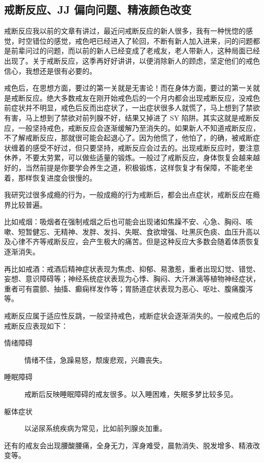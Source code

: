 \documentclass[fontset=founder]{ctexart}
\begin{document}
\subsection{戒断反应、JJ 偏向问题、精液颜色改变}

戒断反应我以前的文章有讲过，最近问戒断反应的新人很多，我有一种恍惚的感觉，时空错位的感觉，戒色吧已经进入了轮回，不断有新人加入进来，问的问题都是前辈问过的问题，而以前的新人已经变成了老戒友，老人带新人，这种局面已经出现了。关于戒断反应，这季再好好讲讲，以便消除新人的顾虑，坚定他们的戒色信心，我想还是很有必要的。

戒色后，在思想方面，要过的第一关就是无害论！而在身体方面，要过的第一关就是戒断反应。绝大多数戒友在刚开始戒色后的一个月内都会出现戒断反应，没戒色前症状并不明显，戒色后反而出症状了，一出症状很多人就慌了，马上想到了禁欲有害，马上想到了禁欲对前列腺不好，结果又掉进了 SY 陷阱。其实这就是戒断反应，一般坚持戒色，戒断反应会逐渐缓解乃至消失的。如果新人不知道戒断反应，不了解戒断反应，那就很可能会起退心了。因为他慌了，他怕了，的确，被戒断症状缠着的感受不好过，但只要坚持，戒断反应会过去的。出现戒断反应时，要注意休养，不要太劳累，可以做些适量的锻炼。一般过了戒断反应，身体恢复会越来越好的，当然前提是你要学会养生之道，积极锻炼，这样恢复才有保障，不能老坐着，那样恢复进度会很慢的。

我研究过很多成瘾的行为，一般成瘾的行为戒断后，都会出点症状，戒断反应在瘾界比较普遍。

比如戒烟：吸烟者在强制戒烟之后也可能会出现诸如焦躁不安、心急、胸闷、咳嗽、短暂健忘、无精神、发胖、发抖、失眠、食欲增强、吐黑灰色痰、血压升高以及心律不齐等戒断反应，会产生极大的痛苦。但是这种反应大多数会随着体质恢复逐渐消失。

再比如戒酒：戒酒后精神症状表现为焦虑、抑郁、易激惹，重者出现幻觉、错觉、妄想、意识障碍等；神经系统症状表现为心悸、胸闷、大汗淋漓等植物神经症状，重者可有震颤、抽搐、癫痫样发作等；胃肠道症状表现为恶心、呕吐、腹痛腹泻等。

戒断反应属于适应性反跳，一般坚持戒色，戒断症状会逐渐消失的。一般戒色后的戒断反应表现如下：

\begin{description}
    \item[情绪障碍] 情绪不佳，急躁易怒，颓废悲观，兴趣丧失。
    \item[睡眠障碍] 戒断后反映睡眠障碍的戒友很多。以入睡困难，失眠多梦比较多见。
    \item[躯体症状] 以泌尿系统疾病为常见，比如前列腺炎加重。
\end{description}

还有的戒友会出现腰酸腰痛，全身无力，浑身难受，晨勃消失、脱发增多、精液改变等。
\end{document}
